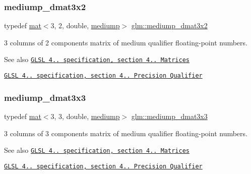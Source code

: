 \subsubsection{\texorpdfstring{mediump\+\_\+dmat3x2}{mediump\_dmat3x2}}
{\footnotesize\ttfamily typedef \hyperlink{structglm_1_1mat}{mat}$<$3, 2, double, \hyperlink{namespaceglm_a36ed105b07c7746804d7fdc7cc90ff25a6416f3ea0c9025fb21ed50c4d6620482}{mediump}$>$ \hyperlink{group__core__precision_gaefc11f3917dc7882f4399a47393792fa}{glm\+::mediump\+\_\+dmat3x2}}

3 columns of 2 components matrix of medium qualifier floating-\/point numbers.

\begin{DoxySeeAlso}{See also}
\href{http://www.opengl.org/registry/doc/GLSLangSpec.4.20.8.pdf}{\tt G\+L\+SL 4.. specification, section 4.. Matrices} 

\href{http://www.opengl.org/registry/doc/GLSLangSpec.4.20.8.pdf}{\tt G\+L\+SL 4.. specification, section 4.. Precision Qualifier} 
\end{DoxySeeAlso}
\mbox{\label{group__core__precision_ga8ecaed5443b0aa73bbe8683fcbb04f65}} 
\subsubsection{\texorpdfstring{mediump\+\_\+dmat3x3}{mediump\_dmat3x3}}
{\footnotesize\ttfamily typedef \hyperlink{structglm_1_1mat}{mat}$<$3, 3, double, \hyperlink{namespaceglm_a36ed105b07c7746804d7fdc7cc90ff25a6416f3ea0c9025fb21ed50c4d6620482}{mediump}$>$ \hyperlink{group__core__precision_ga8ecaed5443b0aa73bbe8683fcbb04f65}{glm\+::mediump\+\_\+dmat3x3}}

3 columns of 3 components matrix of medium qualifier floating-\/point numbers.

\begin{DoxySeeAlso}{See also}
\href{http://www.opengl.org/registry/doc/GLSLangSpec.4.20.8.pdf}{\tt G\+L\+SL 4.. specification, section 4.. Matrices} 

\href{http://www.opengl.org/registry/doc/GLSLangSpec.4.20.8.pdf}{\tt G\+L\+SL 4.. specification, section 4.. Precision Qualifier} 
\end{DoxySeeAlso}
\mbox{\label{group__core__precision_ga8e38f500f63f5caed06699264acfb456}} 
